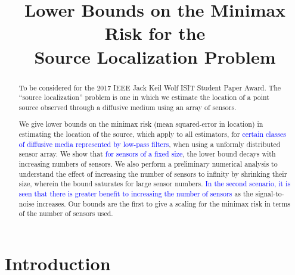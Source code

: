 \documentclass[conference]{IEEEtran}
\title{Lower Bounds on the Minimax Risk for the \\ Source Localization Problem}
\author{
	\IEEEauthorblockN{
		\textcolor{blue}{Praveen Venkatesh %
		and Pulkit Grover} %
	}
}
\begin{document}
\maketitle
\thispagestyle{plain}
\pagestyle{plain}

\begin{abstract}

To be considered for the 2017 IEEE Jack Keil Wolf ISIT Student Paper Award.
The ``source localization'' problem is one in which we estimate the location of
a point source observed through a diffusive medium using an array of sensors.

We give lower bounds on the minimax risk (mean squared-error in location) in
estimating the location of the source, which apply to all estimators, for
\textcolor{blue}{certain classes of diffusive media represented by low-pass
filters}, when using a unformly distributed sensor array. We show that
\textcolor{blue}{for sensors of a fixed size}, the lower bound decays with
increasing numbers of sensors. We also perform a preliminary numerical analysis
to understand the effect of increasing the number of sensors to infinity by
shrinking their size, wherein the bound saturates for large sensor numbers.
\textcolor{blue}{In the second scenario, it is seen that there is greater
benefit to increasing the number of sensors} as the signal-to-noise increases.
Our bounds are the first to give a scaling for the minimax risk in terms of the
number of sensors used.


\end{abstract}

\section{Introduction}

\end{document}
